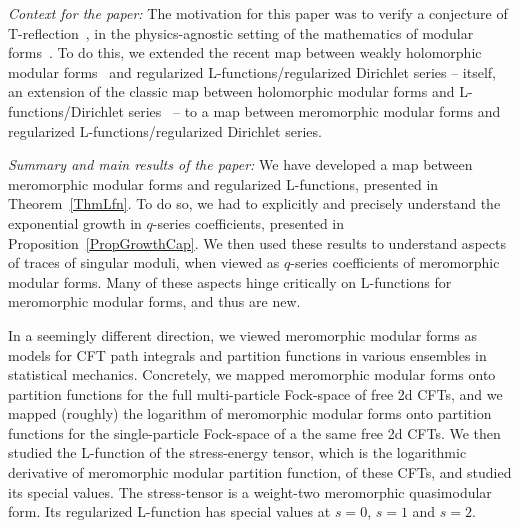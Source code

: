 \documentclass[11pt,a4paper]{article}
\begin{document}
{\em Context for the paper:} The motivation for this paper was to verify a conjecture of T-reflection~\cite{14T-rex0}, in the physics-agnostic setting of the mathematics of modular forms~\cite{06T-rex1, 07T-rex2}. To do this, we extended the recent map between weakly holomorphic modular forms~\cite{03-BFI, 04-BFK, 05-BFK2} and regularized L-functions/regularized Dirichlet series -- itself, an extension of the classic map between holomorphic modular forms and L-functions/Dirichlet series~\cite{01-Apostol} -- to a map between meromorphic modular forms and regularized L-functions/regularized Dirichlet series.

{\em Summary and main results of the paper:} We have developed a map between meromorphic modular forms and regularized L-functions, presented in Theorem~\ref{ThmLfn}. To do so, we had to explicitly and precisely understand the exponential growth in $q$-series coefficients, presented in Proposition~\ref{PropGrowthCap}. We then used these results to understand aspects of traces of singular moduli, when viewed as $q$-series coefficients of meromorphic modular forms. Many of these aspects hinge critically on L-functions for meromorphic modular forms, and thus are new.

In a seemingly different direction, we viewed meromorphic modular forms as models for CFT path integrals and partition functions in various ensembles in statistical mechanics. Concretely, we mapped meromorphic modular forms onto partition functions for the full multi-particle Fock-space of free 2d CFTs, and we mapped (roughly) the logarithm of meromorphic modular forms onto partition functions for the single-particle Fock-space of a the same free 2d CFTs. We then studied the L-function of the stress-energy tensor, which is the logarithmic derivative of meromorphic modular partition function, of these CFTs, and studied its special values. The stress-tensor is a weight-two meromorphic quasimodular form. Its regularized L-function has special values at $s = 0$, $s = 1$ and $s = 2$. 
\end{document}
